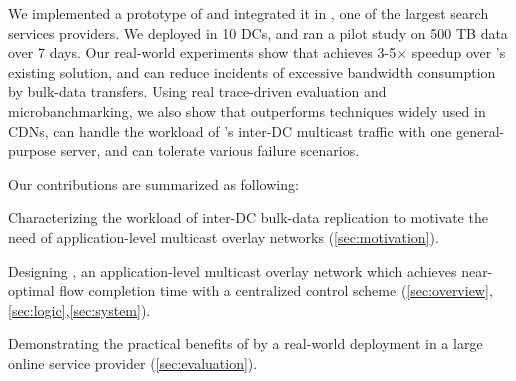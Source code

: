 We implemented a prototype of \name and integrated it in
\company, one of the largest search services providers.
We deployed \name in 10 DCs, and ran a pilot study on 500 TB
data over 7 days.
Our real-world experiments show that \name achieves 3-5$\times$
speedup over \company's existing solution, and can reduce 
incidents of excessive bandwidth consumption by bulk-data
transfers.
Using real trace-driven evaluation and microbanchmarking,
we also show that \name outperforms techniques widely used in
CDNs, can handle the workload of \company's
inter-DC multicast traffic with one general-purpose server,
and can tolerate various failure scenarios.


Our contributions are summarized as following:
\begin{packeditemize}
\item Characterizing the workload of inter-DC bulk-data
replication to motivate the need of application-level
multicast overlay networks (\Section\ref{sec:motivation}).
\item Designing \name, an application-level
multicast overlay network which achieves near-optimal flow completion
time with a centralized control scheme (\Section\ref{sec:overview},\ref{sec:logic},\ref{sec:system}).
\item Demonstrating the practical benefits of \name by a real-world
 deployment in a large online service provider (\Section\ref{sec:evaluation}).
\end{packeditemize}
